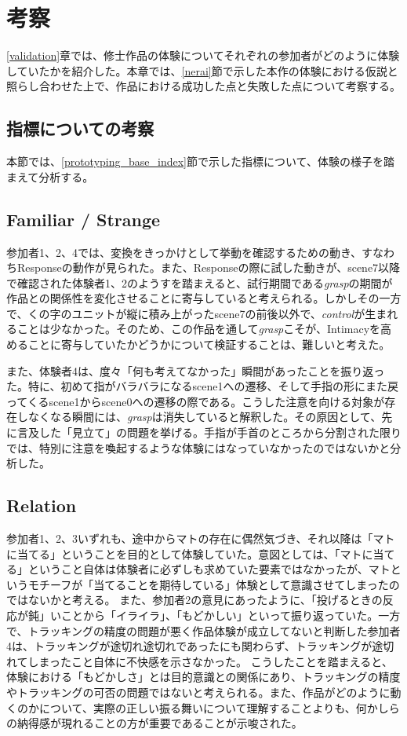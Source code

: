 \chapter{考察}
\label{考察}
\ref{validation}章では、修士作品の体験についてそれぞれの参加者がどのように体験していたかを紹介した。本章では、\ref{nerai}節で示した本作の体験における仮説と照らし合わせた上で、作品における成功した点と失敗した点について考察する。

\section{指標についての考察}
本節では、\ref{prototyping_base_index}節で示した指標について、体験の様子を踏まえて分析する。

\section{Familiar / Strange}
参加者1、2、4では、変換をきっかけとして挙動を確認するための動き、すなわちResponseの動作が見られた。また、Responseの際に試した動きが、scene7以降で確認された体験者1、2のようすを踏まえると、試行期間である\textit{grasp}の期間が作品との関係性を変化させることに寄与していると考えられる。しかしその一方で、くの字のユニットが縦に積み上がったscene7の前後以外で、\textit{control}が生まれることは少なかった。そのため、この作品を通して\textit{grasp}こそが、Intimacyを高めることに寄与していたかどうかについて検証することは、難しいと考えた。


また、体験者4は、度々「何も考えてなかった」瞬間があったことを振り返った。特に、初めて指がバラバラになるscene1への遷移、そして手指の形にまた戻ってくるscene1からscene0への遷移の際である。こうした注意を向ける対象が存在しなくなる瞬間には、\textit{grasp}は消失していると解釈した。その原因として、先に言及した「見立て」の問題を挙げる。手指が手首のところから分割された限りでは、特別に注意を喚起するような体験にはなっていなかったのではないかと分析した。

\section{Relation}
参加者1、2、3いずれも、途中からマトの存在に偶然気づき、それ以降は「マトに当てる」ということを目的として体験していた。意図としては、「マトに当てる」ということ自体は体験者に必ずしも求めていた要素ではなかったが、マトというモチーフが「当てることを期待している」体験として意識させてしまったのではないかと考える。
また、参加者2の意見にあったように、「投げるときの反応が鈍」いことから「イライラ」、「もどかしい」といって振り返っていた。一方で、トラッキングの精度の問題が悪く作品体験が成立してないと判断した参加者4は、トラッキングが途切れ途切れであったにも関わらず、トラッキングが途切れてしまったこと自体に不快感を示さなかった。
こうしたことを踏まえると、体験における「もどかしさ」とは目的意識との関係にあり、トラッキングの精度やトラッキングの可否の問題ではないと考えられる。また、作品がどのように動くのかについて、実際の正しい振る舞いについて理解することよりも、何かしらの納得感が現れることの方が重要であることが示唆された。

